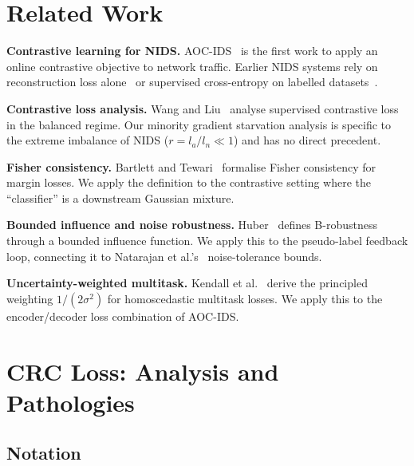 \documentclass[conference]{IEEEtran}
\begin{document}
\section{Related Work}

\noindent\textbf{Contrastive learning for NIDS.}
AOC-IDS~\cite{zhang2024aoc} is the first work to apply an online
contrastive objective to network traffic. Earlier NIDS systems rely on
reconstruction loss alone~\cite{mirsky2018kitsune} or supervised cross-entropy
on labelled datasets~\cite{ring2019flow}.

\noindent\textbf{Contrastive loss analysis.}
Wang and Liu~\cite{wang2021understanding} analyse supervised contrastive
loss in the balanced regime. Our minority gradient starvation analysis
is specific to the extreme imbalance of NIDS ($r = l_a/l_n \ll 1$)
and has no direct precedent.

\noindent\textbf{Fisher consistency.}
Bartlett and Tewari~\cite{bartlett2007adaboost} formalise Fisher consistency
for margin losses. We apply the definition to the contrastive setting
where the ``classifier'' is a downstream Gaussian mixture.

\noindent\textbf{Bounded influence and noise robustness.}
Huber~\cite{huber1964robust} defines B-robustness through a bounded influence
function. We apply this to the pseudo-label feedback loop, connecting it
to Natarajan et al.'s~\cite{natarajan2013learning} noise-tolerance bounds.

\noindent\textbf{Uncertainty-weighted multitask.}
Kendall et al.~\cite{kendall2018multi} derive the principled weighting
$1/(2\sigma^2)$ for homoscedastic multitask losses. We apply this to the
encoder/decoder loss combination of AOC-IDS.

\section{CRC Loss: Analysis and Pathologies}

\subsection{Notation}
\end{document}
